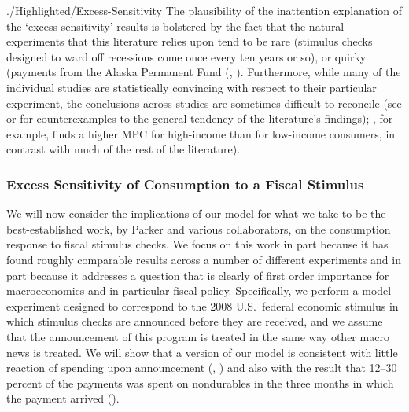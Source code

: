 \documentclass[titlepage]{\econtex}
\begin{document}
\begin{verbatimwrite}{./Highlighted/Excess-Sensitivity}
The plausibility of the inattention explanation of the `excess sensitivity' results is bolstered by the fact that the natural experiments that this literature relies upon tend to be rare (stimulus checks designed to ward off recessions come once every ten years or so), or quirky (payments from the Alaska Permanent Fund (\cite{hsiehAlaska}, \cite{kuengAlaska}).  Furthermore, while many of the individual studies are statistically convincing with respect to their particular experiment, the conclusions across studies are sometimes difficult to reconcile (see \cite{hsiehAlaska} or \cite{CoulibalyLiMortgage} for counterexamples to the general tendency of the literature's findings); \cite{kuengAlaska}, for example, finds a higher MPC for high-income than for low-income consumers, in contrast with much of the rest of the literature).


\hypertarget{Excess-Sensitivity-Experiment}{}
\subsubsection{Excess Sensitivity of Consumption to a Fiscal Stimulus}

We will now consider the implications of our model for what we take to be the best-established work, by Parker and various collaborators, on the consumption response to fiscal stimulus checks. We focus on this work in part because it has found roughly comparable results across a number of different experiments and in part because it addresses a question that is clearly of first order importance for macroeconomics and in particular fiscal policy. Specifically, we perform a model experiment designed to correspond to the 2008 U.S.\ federal economic stimulus in which stimulus checks are announced before they are received, and we assume that the announcement of this program is treated in the same way other macro news is treated. We will show that a version of our model is consistent with little reaction of spending upon announcement (\cite{brodaParker}, \cite{parker25million}) and also with the result that 12--30 percent of the payments was spent on nondurables in the three months in which the payment arrived (\cite{psjmMPC2008}).



\end{verbatimwrite}
\end{document}
